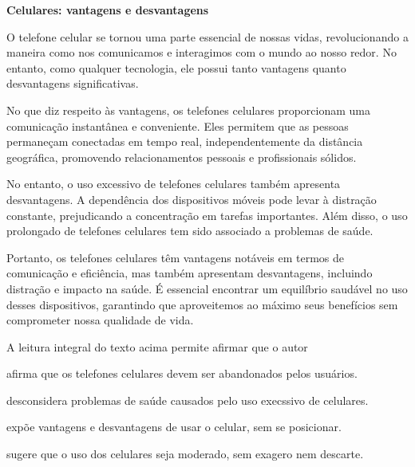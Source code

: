 \begin{myquote}

\textbf{Celulares: vantagens e desvantagens}

O telefone celular se tornou uma parte essencial de nossas vidas,
revolucionando a maneira como nos comunicamos e interagimos com o mundo ao
nosso redor. No entanto, como qualquer tecnologia, ele possui tanto vantagens
quanto desvantagens significativas.

No que diz respeito às vantagens, os telefones celulares proporcionam uma
comunicação instantânea e conveniente. Eles permitem que as pessoas permaneçam
conectadas em tempo real, independentemente da distância geográfica,
promovendo relacionamentos pessoais e profissionais sólidos. 

No entanto, o uso excessivo de telefones celulares também apresenta
desvantagens. A dependência dos dispositivos móveis pode levar à distração
constante, prejudicando a concentração em tarefas importantes. Além disso, o
uso prolongado de telefones celulares tem sido associado a problemas de saúde.

Portanto, os telefones celulares têm vantagens notáveis em termos de
comunicação e eficiência, mas também apresentam desvantagens, incluindo
distração e impacto na saúde. É essencial encontrar um equilíbrio saudável 
no uso desses dispositivos, garantindo que aproveitemos ao máximo seus 
benefícios sem comprometer nossa qualidade de vida.


\end{myquote}

A leitura integral do texto acima permite afirmar que o autor

\begin{escolha}
  
  \item afirma que os telefones celulares devem ser abandonados pelos usuários.
  
  \item desconsidera problemas de saúde causados pelo uso execssivo de celulares.
  
  \item expõe vantagens e desvantagens de usar o celular, sem se posicionar.
  
  \item sugere que o uso dos celulares seja moderado, sem exagero nem descarte.

\end{escolha}


